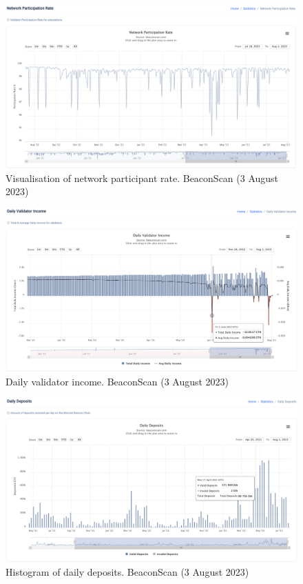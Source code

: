 \documentclass[UTF8]{article}
\begin{document}
{\begin{figure}[htbp]
\begin{center}
\includegraphics[width=\linewidth]{images/beaconscan11}
\caption{Visualisation of network participant rate. BeaconScan (3 August 2023)}
\label{fig:beaconscan11}
\end{center}
\end{figure}

\begin{figure}[htbp]
\begin{center}
\includegraphics[width=\linewidth]{images/beaconscan12}
\caption{Daily validator income. BeaconScan (3 August 2023)}
\label{fig:beaconscan12}
\end{center}
\end{figure}

\begin{figure}[htbp]
\begin{center}
\includegraphics[width=\linewidth]{images/beaconscan13}
\caption{Histogram of daily deposits. BeaconScan (3 August 2023)}
\label{fig:beaconscan13}
\end{center}
\end{figure}

}
\end{document}
